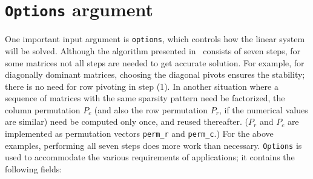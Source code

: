 \section{{\tt Options} argument}
\label{sec:options}
One important input argument is {\tt options}, which controls how the
linear system will be solved.
Although the algorithm presented in~ consists of
seven steps, for some matrices not all steps are needed to get
accurate solution. For example, for diagonally dominant matrices, 
choosing the diagonal pivots ensures the stability;
there is no need for row pivoting in step (1).
In another situation where a sequence of matrices with the
same sparsity pattern need be factorized, the column
permutation $P_c$ (and also the row permutation $P_r$, if
the numerical values are similar) need be computed only
once, and reused thereafter. ($P_r$ and $P_c$
are implemented as permutation vectors {\tt perm\_r} and {\tt perm\_c}.)
For the above examples, performing all seven steps does more
work than necessary. 
{\tt Options} is used to accommodate the various requirements of applications;
it contains the following fields:
